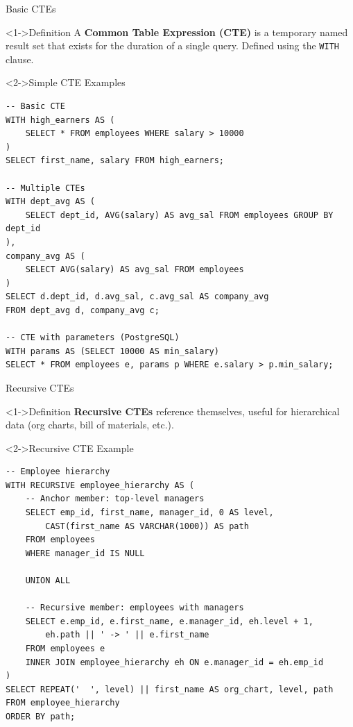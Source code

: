 \documentclass[aspectratio=169,11pt]{beamer}
\begin{document}
\begin{frame}[fragile]{Basic CTEs}
\begin{block}<1->{Definition}
A \textbf{Common Table Expression (CTE)} is a temporary named result set that exists for the duration of a single query. Defined using the \texttt{WITH} clause.
\end{block}

\pause
\begin{exampleblock}<2->{Simple CTE Examples}
\begin{lstlisting}
-- Basic CTE
WITH high_earners AS (
    SELECT * FROM employees WHERE salary > 10000
)
SELECT first_name, salary FROM high_earners;

-- Multiple CTEs
WITH dept_avg AS (
    SELECT dept_id, AVG(salary) AS avg_sal FROM employees GROUP BY dept_id
),
company_avg AS (
    SELECT AVG(salary) AS avg_sal FROM employees
)
SELECT d.dept_id, d.avg_sal, c.avg_sal AS company_avg
FROM dept_avg d, company_avg c;

-- CTE with parameters (PostgreSQL)
WITH params AS (SELECT 10000 AS min_salary)
SELECT * FROM employees e, params p WHERE e.salary > p.min_salary;
\end{lstlisting}
\end{exampleblock}
\end{frame}

\begin{frame}[fragile]{Recursive CTEs}
\begin{block}<1->{Definition}
\textbf{Recursive CTEs} reference themselves, useful for hierarchical data (org charts, bill of materials, etc.).
\end{block}

\pause
\begin{exampleblock}<2->{Recursive CTE Example}
\begin{lstlisting}
-- Employee hierarchy
WITH RECURSIVE employee_hierarchy AS (
    -- Anchor member: top-level managers
    SELECT emp_id, first_name, manager_id, 0 AS level,
        CAST(first_name AS VARCHAR(1000)) AS path
    FROM employees
    WHERE manager_id IS NULL
    
    UNION ALL
    
    -- Recursive member: employees with managers
    SELECT e.emp_id, e.first_name, e.manager_id, eh.level + 1,
        eh.path || ' -> ' || e.first_name
    FROM employees e
    INNER JOIN employee_hierarchy eh ON e.manager_id = eh.emp_id
)
SELECT REPEAT('  ', level) || first_name AS org_chart, level, path
FROM employee_hierarchy
ORDER BY path;
\end{lstlisting}
\end{exampleblock}
\end{frame}
\end{document}
